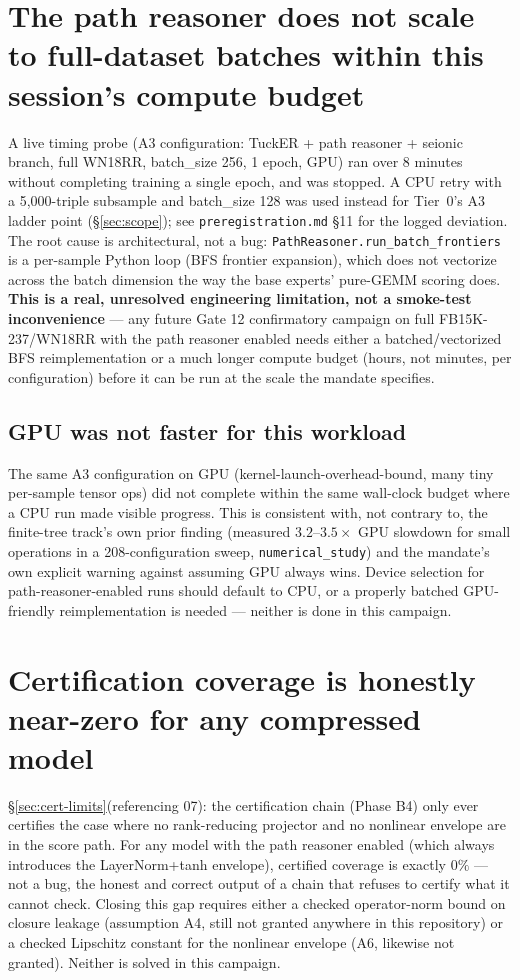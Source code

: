 \documentclass[11pt]{article}
\begin{document}
\section{The path reasoner does not scale to full-dataset batches within this session's compute budget}
\label{sec:scale}
A live timing probe (A3 configuration: TuckER + path reasoner + seionic branch, full WN18RR,
batch\_size 256, 1 epoch, GPU) ran over 8 minutes without completing training a single epoch, and
was stopped. A CPU retry with a 5,000-triple subsample and batch\_size 128 was used instead for
Tier~0's A3 ladder point (\S\ref{sec:scope}); see \texttt{preregistration.md} \S11 for the logged
deviation. The root cause is architectural, not a bug: \texttt{PathReasoner.run\_batch\_frontiers}
is a per-sample Python loop (BFS frontier expansion), which does not vectorize across the batch
dimension the way the base experts' pure-GEMM scoring does. \textbf{This is a real, unresolved
engineering limitation, not a smoke-test inconvenience} --- any future Gate 12 confirmatory
campaign on full FB15K-237/WN18RR with the path reasoner enabled needs either a batched/vectorized
BFS reimplementation or a much longer compute budget (hours, not minutes, per configuration) before
it can be run at the scale the mandate specifies.

\subsection{GPU was not faster for this workload}
The same A3 configuration on GPU (kernel-launch-overhead-bound, many tiny per-sample tensor ops)
did not complete within the same wall-clock budget where a CPU run made visible progress. This is
consistent with, not contrary to, the finite-tree track's own prior finding (measured
$3.2$--$3.5\times$ GPU slowdown for small operations in a 208-configuration sweep,
\texttt{numerical\_study}) and the mandate's own explicit warning against assuming GPU always wins.
Device selection for path-reasoner-enabled runs should default to CPU, or a properly batched
GPU-friendly reimplementation is needed --- neither is done in this campaign.

\section{Certification coverage is honestly near-zero for any compressed model}
\S\ref{sec:cert-limits}(referencing 07): the certification chain (Phase B4) only ever certifies
the case where no rank-reducing projector and no nonlinear envelope are in the score path. For any
model with the path reasoner enabled (which always introduces the LayerNorm+tanh envelope),
certified coverage is exactly $0\%$ --- not a bug, the honest and correct output of a chain that
refuses to certify what it cannot check. Closing this gap requires either a checked operator-norm
bound on closure leakage (assumption A4, still not granted anywhere in this repository) or a
checked Lipschitz constant for the nonlinear envelope (A6, likewise not granted). Neither is solved
in this campaign.
\end{document}
